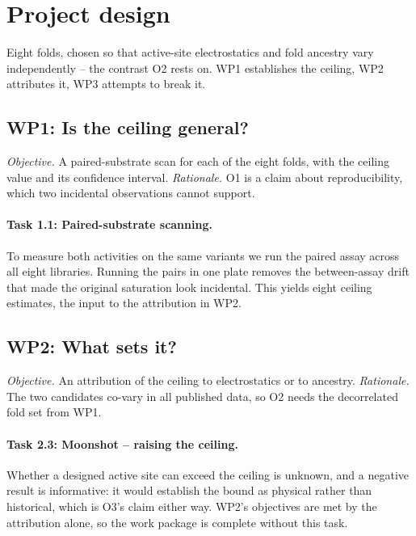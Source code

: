 \documentclass[11pt,a4paper]{article}
\begin{document}
\maketitle
\startsectiona

\section{Project design}
Eight folds, chosen so that active-site electrostatics and fold ancestry vary
independently -- the contrast O2 rests on. WP1 establishes the ceiling, WP2 attributes
it, WP3 attempts to break it.

\startsectionb

\subsection{WP1: Is the ceiling general?}
\emph{Objective.} A paired-substrate scan for each of the eight folds, with the ceiling
value and its confidence interval.
\emph{Rationale.} O1 is a claim about reproducibility, which two incidental
observations cannot support.

\paragraph{Task 1.1: Paired-substrate scanning.}
To measure both activities on the same variants we run the paired assay across all
eight libraries. Running the pairs in one plate removes the between-assay drift that
made the original saturation look incidental. This yields eight ceiling estimates, the
input to the attribution in WP2.

\subsection{WP2: What sets it?}
\emph{Objective.} An attribution of the ceiling to electrostatics or to ancestry.
\emph{Rationale.} The two candidates co-vary in all published data, so O2 needs the
decorrelated fold set from WP1.

\paragraph{Task 2.3: Moonshot -- raising the ceiling.}
Whether a designed active site can exceed the ceiling is unknown, and a negative result
is informative: it would establish the bound as physical rather than historical, which
is O3's claim either way. WP2's objectives are met by the attribution alone, so the
work package is complete without this task.
\end{document}
